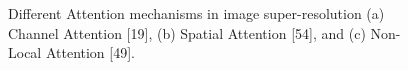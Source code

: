 \documentclass{ieeeaccess}
\begin{document}
\begin{figure}

    \centering
    \newlength{\xfigwd}
    \caption {Different Attention mechanisms in image super-resolution (a) Channel Attention [19], (b) Spatial Attention [54], and (c) Non-Local Attention [49].}

    \label{fig1}

\end{figure}
\end{document}

